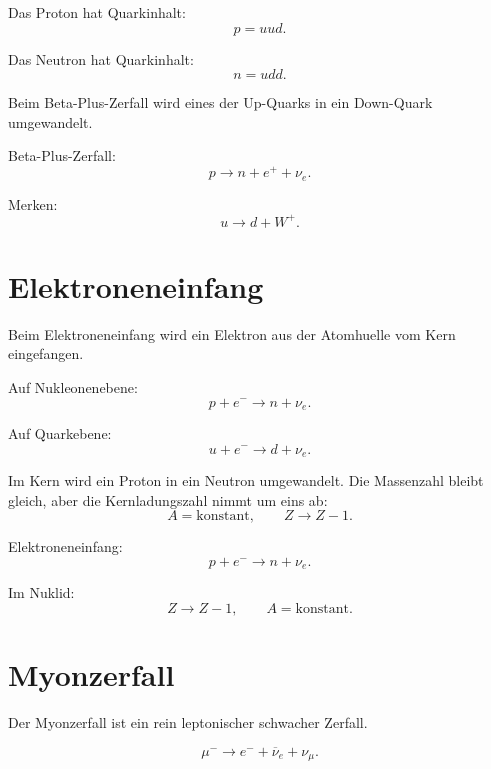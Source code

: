 \begin{conceptbox}
Das Proton hat Quarkinhalt:
\[
    p=uud.
\]

Das Neutron hat Quarkinhalt:
\[
    n=udd.
\]

Beim Beta-Plus-Zerfall wird eines der Up-Quarks in ein Down-Quark umgewandelt.
\end{conceptbox}

\begin{examtipbox}
Beta-Plus-Zerfall:
\[
    p \rightarrow n + e^+ + \nu_e.
\]

Merken:
\[
    u \rightarrow d + W^+.
\]
\end{examtipbox}

\section{Elektroneneinfang}

Beim Elektroneneinfang wird ein Elektron aus der Atomhuelle vom Kern eingefangen.

\begin{formulabox}
Auf Nukleonenebene:
\[
    p + e^- \rightarrow n + \nu_e.
\]
\end{formulabox}

\begin{formulabox}
Auf Quarkebene:
\[
    u + e^- \rightarrow d + \nu_e.
\]
\end{formulabox}

\begin{conceptbox}
Im Kern wird ein Proton in ein Neutron umgewandelt.
Die Massenzahl bleibt gleich, aber die Kernladungszahl nimmt um eins ab:
\[
    A=\text{konstant},
    \qquad
    Z \rightarrow Z-1.
\]
\end{conceptbox}

\begin{examtipbox}
Elektroneneinfang:
\[
    p+e^- \rightarrow n+\nu_e.
\]

Im Nuklid:
\[
    Z \rightarrow Z-1,
    \qquad
    A=\text{konstant}.
\]
\end{examtipbox}

\section{Myonzerfall}

Der Myonzerfall ist ein rein leptonischer schwacher Zerfall.

\begin{formulabox}
\[
    \mu^- \rightarrow e^- + \overline{\nu}_e + \nu_\mu.
\]
\end{formulabox}

